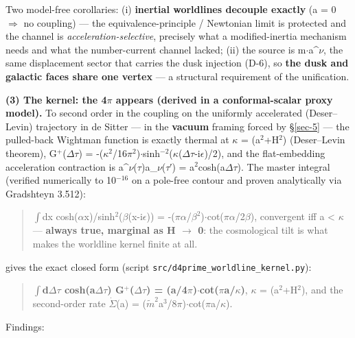 \documentclass[aps,prd,preprint,nofootinbib,superscriptaddress]{revtex4-2}
\begin{document}
Two model-free corollaries: (i) \textbf{inertial worldlines decouple
exactly} (a = 0 \(\Rightarrow\) no coupling) --- the
equivalence-principle / Newtonian limit is protected and the channel is
\emph{acceleration-selective}, precisely what a modified-inertia
mechanism needs and what the number-current channel lacked; (ii) the
source is m\(\cdot\)a\^{}\(\nu\), the same displacement sector that
carries the dusk injection (D-6), so \textbf{the dusk and galactic faces
share one vertex} --- a structural requirement of the unification.

\textbf{(3) The kernel: the 4\(\pi\) appears (derived in a
conformal-scalar proxy model).} To second order in the coupling on the
uniformly accelerated (Deser--Levin) trajectory in de Sitter --- in the
\textbf{vacuum} framing forced by §\ref{sec-5} --- the pulled-back
Wightman function is exactly thermal at \(\kappa\) =
\surd (a\(^{2}\)+H\(^{2}\)) (Deser--Levin theorem),
G\(^{+}\)(\(\Delta\tau\)) =
-(\(\kappa^{2}\)/16\(\pi^{2}\))\(\cdot\)sinh\(^{-2}\)(\(\kappa\)(\(\Delta\tau\)-i\(\epsilon\))/2),
and the flat-embedding acceleration contraction is
a\^{}\(\nu\)(\(\tau\))a\_\(\nu\)(\(\tau\)′) =
a\(^{2}\)cosh(a\(\Delta\tau\)). The master integral (verified
numerically to 10\(^{-16}\) on a pole-free contour and proven
analytically via Gradshteyn 3.512):

\begin{quote}
\(\int\)dx cosh(\(\alpha\)x)/sinh\(^{2}\)(\(\beta\)(x-i\(\epsilon\))) =
-(\(\pi\alpha\)/\(\beta^{2}\))\(\cdot\)cot(\(\pi\alpha\)/2\(\beta\)),
convergent iff a \textless{} \(\kappa\) --- \textbf{always true,
marginal as H \(\to\) 0}: the cosmological tilt is what makes the
worldline kernel finite at all.
\end{quote}

gives the exact closed form (script
\texttt{src/\allowbreak d4prime\_\allowbreak worldline\_\allowbreak kernel.\allowbreak py}):

\begin{quote}
\textbf{\(\int\)d\(\Delta\tau\) cosh(a\(\Delta\tau\))
G\(^{+}\)(\(\Delta\tau\)) =
(a/4\(\pi\))\(\cdot\)cot(\(\pi\)a/\(\kappa\))}, \(\kappa\) =
\surd (a\(^{2}\)+H\(^{2}\)), and the second-order rate
\(\dot{\Sigma}\)(a) =
(\(\tilde{m}^{2}\)a\(^{3}\)/8\(\pi\))\(\cdot\)cot(\(\pi\)a/\(\kappa\)).
\end{quote}

Findings:
\end{document}
